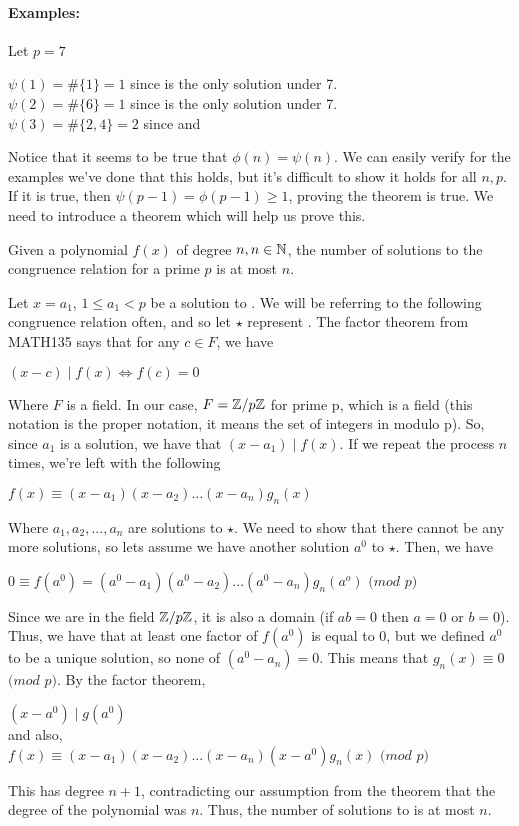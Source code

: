 \documentclass[../main.tex]{subfiles}
\begin{document}
\paragraph{Examples:} Let $p=7$
\begin{center}
    $\psi(1)=\#\{1\}=1$ since  is the only solution under 7. \\
    $\psi(2)=\#\{6\}=1$ since  is the only solution under 7. \\
    $\psi(3)=\#\{2,4\}=2$ since  and 
\end{center}

Notice that it seems to be true that $\phi(n)=\psi(n)$. We can easily verify for the examples we've done that this holds, but it's difficult to show it holds for all $n,p$. If it is true, then $\psi(p-1)=\phi(p-1) \geq 1$, proving the theorem is true. We need to introduce a theorem which will help us prove this.

\begin{thm}
    Given a polynomial $f(x)$ of degree $n, n \in \mathbb{N}$, the number of solutions to the congruence relation  for a prime $p$ is at most $n$. 
\end{thm}
\begin{pf}
    Let $x=a_1$, $1 \leq a_1 < p$ be a solution to . We will be referring to the following congruence relation often, and so let $\star$ represent . \sspace
    The factor theorem from MATH135 says that for any $c \in F$, we have \\
    \centerline{$(x-c)\mid f(x) \iff f(c)=0$} Where $F$ is a field. In our case, $F=\mathbb{Z}/p\mathbb{Z}$ for prime p, which is a field (this notation is the proper notation, it means the set of integers in modulo p). \sspace
    So, since $a_1$ is a solution, we have that $(x-a_1) \mid f(x)$. If we repeat the process $n$ times, we're left with the following \\
    \centerline{$f(x)\equiv (x-a_1)(x-a_2)...(x-a_n)g_n(x)$}
    Where $a_1,a_2,...,a_n$ are solutions to $\star$. We need to show that there cannot be any more solutions, so lets assume we have another solution $a^0$ to $\star$. Then, we have
    \centerline{$0 \equiv f(a^0)=(a^0-a_1)(a^0-a_2)...(a^0-a_n)g_n(a^o)$ $(mod$ $p)$}
    Since we are in the field $\mathbb{Z}/p\mathbb{Z}$, it is also a domain (if $ab=0$ then $a=0$ or $b=0$). Thus, we have that at least one factor of $f(a^0)$ is equal to $0$, but we defined $a^0$ to be a unique solution, so none of $(a^0-a_n)=0$. This means that $g_n(x)\equiv 0$ $(mod$ $p)$. \sspace
    By the factor theorem,
    \begin{center}
        $(x-a^0)\mid g(a^0)$ \\
        and also, \\
        $f(x)\equiv (x-a_1)(x-a_2)...(x-a_n)(x-a^0)g_n(x)$ $(mod$ $p)$
    \end{center}
    This has degree $n+1$, contradicting our assumption from the theorem that the degree of the polynomial was $n$. Thus, the number of solutions to  is at most $n$.
\end{pf}
\end{document}
